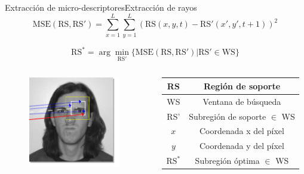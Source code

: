\documentclass{beamer}
\begin{document}
        \begin{frame}{Extracción de micro-descriptores}{Extracción de rayos}
			\begin{equation}\label{algoritmo:eq:mse}	
			    \text{MSE}(\text{RS}, \text{RS}') = \sum_{x=1}^{L} \sum_{y=1}^{L} (\text{RS}(x,y,t) - \text{RS}'(x',y', t+1))^2
		    \end{equation}   
		    
		    \begin{equation}
		        \text{RS}^* = \arg \min_{\text{RS}'}\{\text{MSE}(\text{RS},\text{RS}') | \text{RS}' \in \text{WS} \}
	        \end{equation}
	        
	        \begin{columns}[onlytextwidth]
                \begin{column}{0.5\textwidth}
					\begin{figure}[bt]
        					\centering
                			\includegraphics[width=4cm]{imagenes/MSE1.png}
            			\end{figure}      	        	
	        		\end{column}
                \begin{column}{0.5\textwidth}                
                		\begin{table}
                			
					\begin{tabular}{|c|c|}
					                \hline 
					                RS & Región de soporte \\ 
					                \hline 
					                WS & Ventana de búsqueda \\ 
					                \hline 
					                RS' & Subregión de soporte $\in$ WS \\ 
					                \hline 
					                $x$ & Coordenada x del píxel \\ 
					                \hline 
					                $y$ & Coordenada y del píxel \\ 
					                \hline 
					                $\text{RS}^*$ & Subregión óptima $\in$ WS \\
					                \hline 
					 \end{tabular} 
                		\end{table}
	        		\end{column}
	        \end{columns}	
        \end{frame}
        
\end{document}
